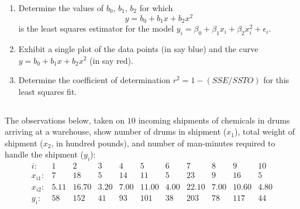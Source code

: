 \documentclass[a4paper]{amsart}
\numberwithin{equation}{section}
\numberwithin{figure}{section}
\theoremstyle{definition}
\begin{document}
% 


\begin{enumerate}
\item Determine the values of $b_0$, $b_1$, $b_2$ for which
$$y = b_0 + b_1x + b_2 x^2$$
is the least squares estimator for the model  $y_i = \beta_0 +\beta_1x_i +\beta_2x_i^2 +\epsilon_i$.

\item Exhibit a single plot of the data points (in say blue)
 and the curve $y = b_0 + b_1x + b_2 x^2$ (in say red).

\item Determine the coefficient of determination $r^2=1-(SSE/SSTO)$ for this least squares fit.
\end{enumerate}

\subsection{}
The observations below, taken on $10$ incoming shipments of chemicals in drums arriving at a warehouse, show number of drums in shipment ($x_1$), total weight of shipment ($x_2$, in hundred pounds), and number of man-minutes required to handle the shipment ($y_i$):
$$\begin{array}{r|llllllllll}
 i:&1&2&3&4&5&6&7&8&9&10\\
\hline x_{i1}: & 7 &18 &5 &14 &11 &5 &23 &9&16 &5\\
x_{i2}: & 5.11 &16.70 &3.20 &7.00 &11.00 &4.00 &22.10 &7.00 &10.60 &4.80\\
y_i: &58 &152 &41 &93 &101 &38 &203 &78 &117 &44
\end{array}$$
\end{document}
